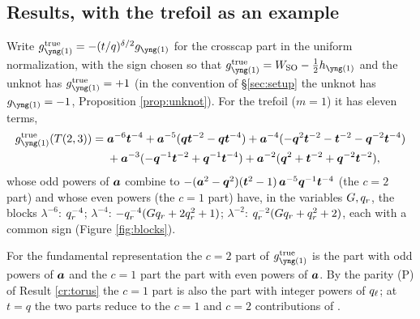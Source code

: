 \subsection{Results, with the trefoil as an example}
Write $g^{\mathrm{true}}_{\yone} = -(t/q)^{\delta/2} g_{\yone}$ for the crosscap part in the uniform normalization, with the sign chosen so that $g^{\mathrm{true}}_{\yone} = W_{\SO} - \tfrac12 h_{\yone}$ and the unknot has $g^{\mathrm{true}}_{\yone} = +1$ (in the convention of \S\ref{sec:setup} the unknot has $g_{\yone} = -1$, Proposition \ref{prop:unknot}). For the trefoil ($m = 1$) it has eleven terms,
\begin{equation}\label{eq:trefoil1}
\begin{aligned}
g^{\mathrm{true}}_{\yone}(T(2,3)) ={}& \ba^{-6}\bt^{-4} + \ba^{-5}(\bq\bt^{-2} - \bq\bt^{-4}) + \ba^{-4}(-\bq^{2}\bt^{-2} - \bt^{-2} - \bq^{-2}\bt^{-4})\\
&+ \ba^{-3}(-\bq^{-1}\bt^{-2} + \bq^{-1}\bt^{-4}) + \ba^{-2}(\bq^{2} + \bt^{-2} + \bq^{-2}\bt^{-2}),
\end{aligned}
\end{equation}
whose odd powers of $\bm{a}$ combine to $-(\bm{a}^2 - \bm{q}^2)(\bm{t}^2 - 1)\,\bm{a}^{-5}\bm{q}^{-1}\bm{t}^{-4}$ (the $c = 2$ part) and whose even powers (the $c = 1$ part) have, in the variables $G, q_r$, the blocks $\lambda^{-6}$: $q_r^{-4}$; $\lambda^{-4}$: $-q_r^{-4}(Gq_r + 2q_r^2 + 1)$; $\lambda^{-2}$: $q_r^{-2}(Gq_r + q_r^2 + 2)$, each with a common sign (Figure \ref{fig:blocks}).
\begin{definition}\label{def:c12}
For the fundamental representation the $c = 2$ part of $g^{\mathrm{true}}_{\yone}$ is the part with odd powers of $\bm{a}$ and the $c = 1$ part the part with even powers of $\bm{a}$. By the parity (P) of Result \ref{cr:torus} the $c = 1$ part is also the part with integer powers of $q_\ell$; at $t = q$ the two parts reduce to the $c = 1$ and $c = 2$ contributions of \cite{Marino09}.
\end{definition}

